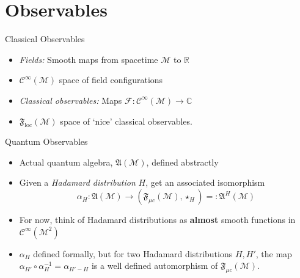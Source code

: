 \documentclass[pdf, fleqn, compress, handout]{beamer}
\newcommand{\mathsterm}[1]{{\itshape\color{dark-teal!80}#1}}
\begin{document}
\section{Observables}

\begin{frame}{Classical Observables}
	\begin{itemize}
		\item	\mathsterm{Fields:}
					Smooth maps from spacetime $\mathcal{M}$ to $\mathbb{R}$
		\item	$\mathcal{C}^\infty(\mathcal{M})$ space of field configurations
		\item	\mathsterm{Classical observables:}
				Maps
				$\mathcal{F}: \mathcal{C}^\infty(\mathcal{M}) \to \mathbb{C}$
		\item	$\mathfrak{F}_\mathrm{loc}(\mathcal{M})$ space of `nice'
				classical observables.
	\end{itemize}
\end{frame}

\begin{frame}{Quantum Observables}
	\begin{itemize}
		\item	Actual quantum algebra, $\mathfrak{A}(\mathcal{M})$,
				defined abstractly
		\item	Given a \mathsterm{Hadamard distribution} $H$,
				get an associated isomorphism
				\begin{equation}
					\alpha_H:
					\mathfrak{A}(\mathcal{M})
						\to
					\left(
						\mathfrak{F}_{\mu c}(\mathcal{M}),
						\star_H
					\right)
						=:
					\mathfrak{A}^H(\mathcal{M})
				\end{equation}
		\item	For now, think of Hadamard distributions
				as \textbf{almost} smooth functions in
				$\mathcal{C}^\infty(\mathcal{M}^2)$
		\item	$\alpha_H$ defined formally,
				but for two Hadamard distributions $H, H'$,
				the map $\alpha_{H'} \circ \alpha_{H}^{-1} = \alpha_{H' - H}$
				is a well defined automorphism of
				$\mathfrak{F}_{\mu c}(\mathcal{M})$.
	\end{itemize}
\end{frame}
\end{document}

